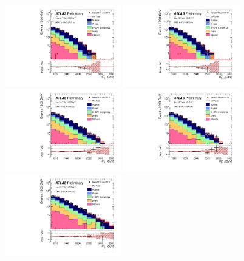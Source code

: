\begin{figure}[tbp]
\begin{center}
\includegraphics[width=0.45\textwidth]{figures/ATLAS-CONF-2016-078_INT/N-1Plots/AtlasStyle/Preliminary/CRQ_SRJigsawSRG1a_LastCut_CRQ_minusone}
\includegraphics[width=0.45\textwidth]{figures/ATLAS-CONF-2016-078_INT/N-1Plots/AtlasStyle/Preliminary/CRQ_SRJigsawSRG1b_LastCut_CRQ_minusone}
\includegraphics[width=0.45\textwidth]{figures/ATLAS-CONF-2016-078_INT/N-1Plots/AtlasStyle/Preliminary/CRQ_SRJigsawSRG2a_LastCut_CRQ_minusone}
\includegraphics[width=0.45\textwidth]{figures/ATLAS-CONF-2016-078_INT/N-1Plots/AtlasStyle/Preliminary/CRQ_SRJigsawSRG2b_LastCut_CRQ_minusone}
\includegraphics[width=0.45\textwidth]{figures/ATLAS-CONF-2016-078_INT/N-1Plots/AtlasStyle/Preliminary/CRQ_SRJigsawSRG3a_LastCut_CRQ_minusone}

\end{center}
\end{figure}
